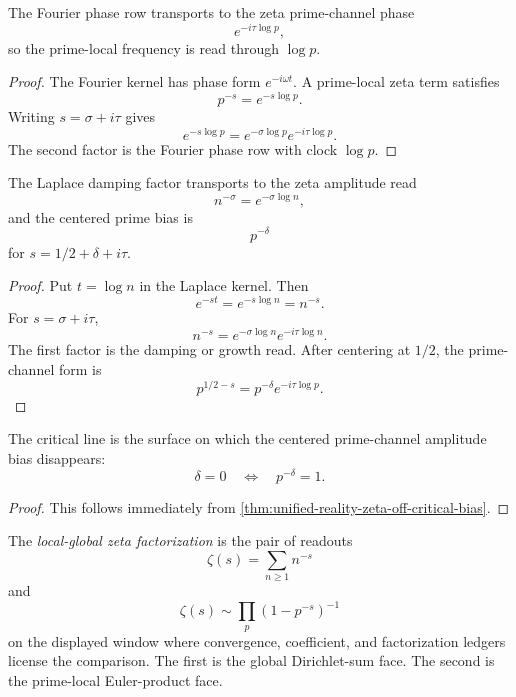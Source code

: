 \begin{theorem}
\label{thm:unified-reality-zeta-log-prime-frequency}
The Fourier phase row transports to the zeta prime-channel phase
$$
e^{-i\tau\log p},
$$
so the prime-local frequency is read through $\log p$.
\end{theorem}

\begin{proof}
The Fourier kernel has phase form $e^{-i\omega t}$. A prime-local zeta
term satisfies
$$
p^{-s}=e^{-s\log p}.
$$
Writing $s=\sigma+i\tau$ gives
$$
e^{-s\log p}=e^{-\sigma\log p}e^{-i\tau\log p}.
$$
The second factor is the Fourier phase row with clock $\log p$.
\end{proof}

\begin{theorem}
\label{thm:unified-reality-zeta-off-critical-bias}
The Laplace damping factor transports to the zeta amplitude read
$$
n^{-\sigma}=e^{-\sigma\log n},
$$
and the centered prime bias is
$$
p^{-\delta}
$$
for $s=1/2+\delta+i\tau$.
\end{theorem}

\begin{proof}
Put $t=\log n$ in the Laplace kernel. Then
$$
e^{-st}=e^{-s\log n}=n^{-s}.
$$
For $s=\sigma+i\tau$,
$$
n^{-s}=e^{-\sigma\log n}e^{-i\tau\log n}.
$$
The first factor is the damping or growth read. After centering at
$1/2$, the prime-channel form is
$$
p^{1/2-s}=p^{-\delta}e^{-i\tau\log p}.
$$
\end{proof}

\begin{corollary}
\label{cor:unified-reality-zeta-critical-line-zero-bias}
The critical line is the surface on which the centered prime-channel
amplitude bias disappears:
$$
\delta=0
\quad\Longleftrightarrow\quad
p^{-\delta}=1.
$$
\end{corollary}

\begin{proof}
This follows immediately from
\autoref{thm:unified-reality-zeta-off-critical-bias}.
\end{proof}

\begin{definition}
\label{def:unified-reality-zeta-local-global-factorization}
The \emph{local-global zeta factorization} is the pair of readouts
$$
\zeta(s)=\sum_{n\ge1}n^{-s}
$$
and
$$
\zeta(s)\sim\prod_p(1-p^{-s})^{-1}
$$
on the displayed window where convergence, coefficient, and
factorization ledgers license the comparison. The first is the global
Dirichlet-sum face. The second is the prime-local Euler-product face.
\end{definition}

